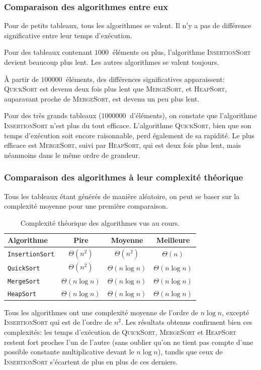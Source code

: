 \documentclass[a4paper, 12pt]{article}
\begin{document}
	\subsubsection*{Comparaison des algorithmes entre eux}
	Pour de petits tableaux, tous les algorithmes se valent. Il n'y a pas de différence significative entre leur temps d'exécution.\par
	Pour des tableaux contenant \(\SI{1000}{}\) éléments ou plus, l'algorithme \textsc{InsertionSort} devient beaucoup plus lent. Les autres algorithmes se valent toujours.\par
	À partir de \(\SI{100000}{}\) éléments, des différences significatives apparaissent: \textsc{QuickSort} est devenu deux fois plus lent que \textsc{MergeSort}, et \textsc{HeapSort}, auparavant proche de \textsc{MergeSort}, est devenu un peu plus lent.\par
	Pour des très grands tableaux (\(\SI{1000000}{}\) d'éléments), on constate que l'algorithme \textsc{InsertionSort} n'est plus du tout efficace. L'algorithme \textsc{QuickSort}, bien que son temps d'exécution soit encore raisonnable, perd également de sa rapidité. Le plus efficace est \textsc{MergeSort}, suivi par \textsc{HeapSort}, qui est deux fois plus lent, mais néanmoins dans le même ordre de grandeur.
	\subsubsection*{Comparaison des algorithmes à leur complexité théorique}
	Tous les tableaux étant générés de manière aléatoire, on peut se baser sur la complexité moyenne pour une première comparaison.\par
	\begin{table}[!h]
		\centering
		\begin{tabular}{l|c|c|c}
			Algorithme & Pire & Moyenne & Meilleure\\
			\hline
			\hline
			\texttt{InsertionSort} & \(\Theta\left(n^{2}\right)\) & \(\Theta\left(n^{2}\right)\) & \(\Theta\left(n\right)\)\\
			\hline
			\texttt{QuickSort} & \(\Theta\left(n^2\right)\) & \(\Theta\left(n\log n\right)\) & \(\Theta\left(n\log n\right)\)\\
			\hline
			\texttt{MergeSort} & \(\Theta\left(n\log n\right)\) & \(\Theta\left(n\log n\right)\) & \(\Theta\left(n\log n\right)\)\\
			\hline
			\texttt{HeapSort} & \(\Theta\left(n\log n\right)\) & \(\Theta\left(n\log n\right)\) & \(\Theta\left(n\log n\right)\)\\
			\hline
		\end{tabular}
		\caption{Complexité théorique des algorithmes vus au cours.}
		\label{table:complexity}
	\end{table}
	Tous les algorithmes ont une complexité moyenne de l'ordre de \(n\log n\), excepté \textsc{InsertionSort} qui est de l'ordre de \(n^{2}\). Les résultats obtenus confirment bien ces complexités: les temps d'exécution de \textsc{QuickSort}, \textsc{MergeSort} et \textsc{HeapSort} restent fort proches l'un de l'autre (sans oublier qu'on ne tient pas compte d'une possible constante multiplicative devant le $n \log n$), tandis que ceux de \textsc{InsertionSort} s'écartent de plus en plus de ces derniers.
\end{document}
